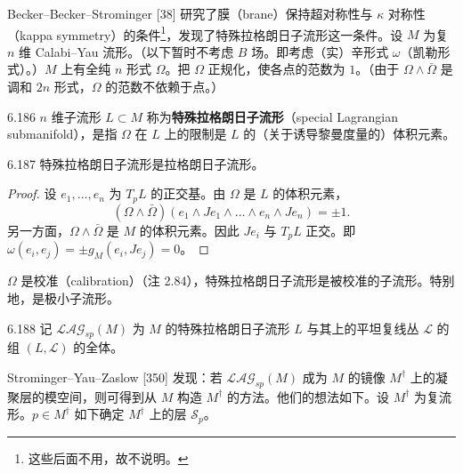
Becker–Becker–Strominger [38] 研究了膜（brane）保持超对称性与 $\kappa$ 对称性（kappa symmetry）的条件\footnote{这些后面不用，故不说明。}，发现了特殊拉格朗日子流形这一条件。设 $M$ 为复 $n$ 维 Calabi–Yau 流形。（以下暂时不考虑 $B$ 场。即考虑（实）辛形式 $\omega$（凯勒形式）。）$M$ 上有全纯 $n$ 形式 $\Omega$。把 $\Omega$ 正规化，使各点的范数为 $1$。（由于 $\Omega\wedge\bar\Omega$ 是调和 $2n$ 形式，$\Omega$ 的范数不依赖于点。）

\begin{definition}{6.186}
  $n$ 维子流形 $L\subset M$ 称为\textbf{特殊拉格朗日子流形}（special Lagrangian submanifold），是指 $\Omega$ 在 $L$ 上的限制是 $L$ 的（关于诱导黎曼度量的）体积元素。
\end{definition}

\begin{lemma*}{6.187}
  特殊拉格朗日子流形是拉格朗日子流形。
\end{lemma*}
\begin{proof}
  设 $e_1,\dots,e_n$ 为 $T_pL$ 的正交基。由 $\Omega$ 是 $L$ 的体积元素，
  \[
    (\Omega\wedge\bar\Omega)(e_1\wedge Je_1\wedge\dots\wedge e_n\wedge Je_n)=\pm1.
  \]
  另一方面，$\Omega\wedge\bar\Omega$ 是 $M$ 的体积元素。因此 $Je_i$ 与 $T_pL$ 正交。即 $\omega(e_i,e_j)=\pm g_M(e_i,Je_j)=0$。
\end{proof}

$\Omega$ 是校准（calibration）（注 2.84），特殊拉格朗日子流形是被校准的子流形。特别地，是极小子流形。

\begin{definition}{6.188}
  记 $\mathcal{LAG}_{sp}(M)$ 为 $M$ 的特殊拉格朗日子流形 $L$ 与其上的平坦复线丛 $\mathcal L$ 的组 $(L,\mathcal L)$ 的全体。
\end{definition}

Strominger–Yau–Zaslow [350] 发现：若 $\mathcal{LAG}_{sp}(M)$ 成为 $M$ 的镜像 $M^\dagger$ 上的凝聚层的模空间，则可得到从 $M$ 构造 $M^\dagger$ 的方法。他们的想法如下。设 $M^\dagger$ 为复流形。$p\in M^\dagger$ 如下确定 $M^\dagger$ 上的层 $\mathcal S_p$。


